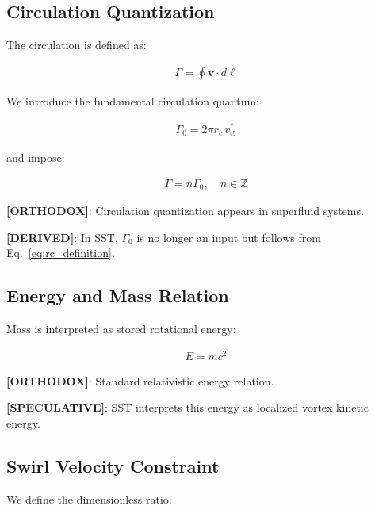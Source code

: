 \documentclass[11pt]{article}
\theoremstyle{definition}
\theoremstyle{plain}
\theoremstyle{remark}
\newcommand{\rc}{{r_c}}
\newcommand{\vchar}{v_{\!\boldsymbol{\circlearrowleft}}^{\ast}}
\begin{document}
    \subsection{Circulation Quantization}
        
        The circulation is defined as:
        
        \begin{align}
            \Gamma = \oint \mathbf{v} \cdot d\ell
        \end{align}
        
        We introduce the fundamental circulation quantum:
        
        \begin{align}
            \Gamma_0 = 2\pi \rc \, \vchar
            \label{eq:gamma0}
        \end{align}
        
        and impose:
        
        \begin{align}
            \Gamma = n \Gamma_0, \quad n \in \mathbb{Z}
        \end{align}
        
        \textbf{[ORTHODOX]}: Circulation quantization appears in superfluid systems.
        
        \textbf{[DERIVED]}: In SST, $\Gamma_0$ is no longer an input but follows from Eq.~\ref{eq:rc_definition}.
    
    \subsection{Energy and Mass Relation}
        
        Mass is interpreted as stored rotational energy:
        
        \begin{align}
            E = m c^2
        \end{align}
        
        \textbf{[ORTHODOX]}: Standard relativistic energy relation.
        
        \textbf{[SPECULATIVE]}: SST interprets this energy as localized vortex kinetic energy.
    
    \subsection{Swirl Velocity Constraint}
        
        We define the dimensionless ratio:
        
\end{document}

